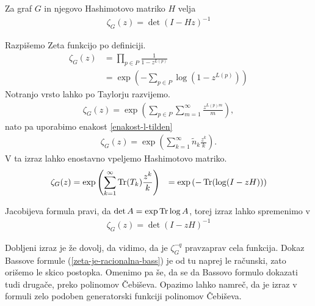 \begin{lema}
    Za graf \(G\) in njegovo Hashimotovo matriko \(H\) velja
    \begin{align*}
        \zeta_G(z) = \det(I-Hz)^{-1}
    \end{align*}
\end{lema}
\begin{dokaz}
    Razpišemo Zeta funkcijo po definiciji.
    \begin{align*}
        \zeta_G(z) &= \prod_{p\in P}\frac{1}{1-z^{L(p)}} \\
        &= \exp\left(-\sum_{p\in P}\log(1-z^{L(p)})\right)
    \end{align*}
    Notranjo vrsto lahko po Taylorju razvijemo.
    \begin{align*}
        \zeta_G(z) =\exp\left(\sum_{p\in P}\sum_{m=1}^\infty \frac{z^{L(p)m}}{m}\right),
    \end{align*}
    nato pa uporabimo enakost \ref{enakost-l-tilden}
    \begin{align*}
        \zeta_G(z) =\exp\left(\sum_{k=1}^\infty \tilde{n}_k \frac{z^k}{k}\right).
    \end{align*}
    V ta izraz lahko enostavno vpeljemo Hashimotovo matriko.
    \begin{align*}
        \zeta_G(z) &= \exp\left(\sum_{k=1}^\infty \operatorname{Tr}(T_k)\frac{z^k}{k}\right)
        &= \exp\left(-\operatorname{Tr}(\log(I - zH))\right)
    \end{align*}

    Jacobijeva formula pravi, da \(\det A = \exp \operatorname{Tr} \log A\), torej izraz lahko spremenimo v
    \begin{align*}
        \zeta_G(z) = \det(I-zH)^{-1}
    \end{align*}
\end{dokaz}
Dobljeni izraz je že dovolj, da vidimo, da je \(\zeta_G^{-q}\) pravzaprav cela funkcija. Dokaz Bassove formule (\ref{zeta-je-racionalna-bass}) je od tu naprej le računski, zato orišemo le skico postopka. Omenimo pa še, da se da Bassovo formulo dokazati tudi drugače, preko polinomov Čebiševa. Opazimo lahko namreč, da je izraz v formuli zelo podoben generatorski funkciji polinomov Čebiševa.

